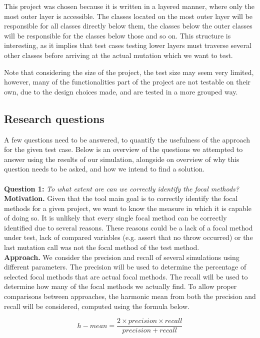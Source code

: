 \documentclass[11pt]{article}
\begin{document}
\begin{multicols}{2}
This project was chosen because it is written in a layered manner, where only the most outer layer is accessible. The classes located on the most outer layer will be responsible for all classes directly below them, the classes below the outer classes will be responsible for the classes below those and so on. This structure is interesting, as it implies that test cases testing lower layers must traverse several other classes before arriving at the actual mutation which we want to test.

Note that considering the size of the project, the test size may seem very limited, however, many of the functionalities part of the project are not testable on their own, due to the design choices made, and are tested in a more grouped way. 

\subsection{Research questions}
A few questions need to be answered, to quantify the usefulness of the approach for the given test case. Below is an overview of the questions we attempted to answer using the results of our simulation, alongside on overview of why this question needs to be asked, and how we intend to find a solution.\\
\\
\noindent
\textbf{Question 1:} \textit{To what extent are can we correctly identify the focal methods?}\\
\textbf{Motivation.} Given that the tool main goal is to correctly identify the focal methods for a given project, we want to know the measure in which it is capable of doing so. It is unlikely that every single focal method can be correctly identified due to several reasons. These reasons could be a lack of a focal method under test, lack of compared variables (e.g. assert that no throw occurred) or the last mutation call was not the focal method of the test method.\\
\textbf{Approach.} We consider the precision and recall of several simulations using different parameters. The precision will be used to determine the percentage of selected focal methods that are actual focal methods. The recall will be used to determine how many of the focal methods we actually find. To allow proper comparisons between approaches, the harmonic mean from both the precision and recall will be considered, computed using the formula below.

\[h-mean = \frac{2 \times precision \times recall}{precision + recall}\]


\end{multicols}
\end{document}

